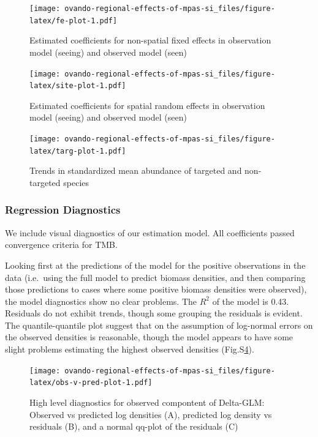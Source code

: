 \documentclass[]{article}
\begin{document}
\newpage

\begin{figure}
\centering
\texttt{[image: ovando-regional-effects-of-mpas-si\_files/figure-latex/fe-plot-1.pdf]}
\caption{\label{fig:fe-plot}Estimated coefficients for non-spatial fixed effects in observation model (seeing) and observed model (seen)}
\end{figure}

\pagebreak

\begin{figure}
\centering
\texttt{[image: ovando-regional-effects-of-mpas-si\_files/figure-latex/site-plot-1.pdf]}
\caption{\label{fig:site-plot}Estimated coefficients for spatial random effects in observation model (seeing) and observed model (seen)}
\end{figure}

\pagebreak

\pagebreak

\begin{figure}
\centering
\texttt{[image: ovando-regional-effects-of-mpas-si\_files/figure-latex/targ-plot-1.pdf]}
\caption{\label{fig:targ-plot}Trends in standardized mean abundance of targeted and non-targeted species}
\end{figure}

\pagebreak

\hypertarget{regression-diagnostics}{%
\subsubsection{Regression Diagnostics}\label{regression-diagnostics}}

We include visual diagnostics of our estimation model. All coefficients passed convergence criteria for TMB.

Looking first at the predictions of the model for the positive observations in the data (i.e.~using the full model to predict biomass densities, and then comparing those predictions to cases where some positive biomass densities were observed), the model diagnostics show no clear problems. The \(R^2\) of the model is 0.43. Residuals do not exhibit trends, though some grouping the residuals is evident. The quantile-quantile plot suggest that on the assumption of log-normal errors on the observed densities is reasonable, though the model appears to have some slight problems estimating the highest observed densities (Fig.S\ref{fig:obs-v-pred-plot}).

\begin{figure}
\centering
\texttt{[image: ovando-regional-effects-of-mpas-si\_files/figure-latex/obs-v-pred-plot-1.pdf]}
\caption{\label{fig:obs-v-pred-plot}High level diagnostics for observed compontent of Delta-GLM: Observed vs predicted log densities (A), predicted log density vs residuals (B), and a normal qq-plot of the residuals (C)}
\end{figure}
\end{document}
